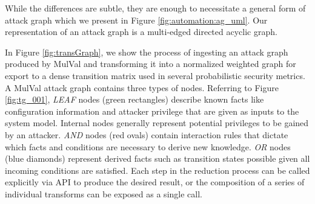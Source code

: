 While the differences are subtle, they are enough to necessitate a general form of attack graph which we present in Figure \ref{fig:automation:ag_uml}. Our representation of an attack graph is a multi-edged directed acyclic graph.     



In Figure \ref{fig:transGraph}, we show the process of ingesting an attack graph produced by MulVal\cite{Ou_Appel_2005} and transforming it into a normalized weighted graph for export to a dense transition matrix used in several probabilistic security metrics. A MulVal attack graph contains three types of nodes. Referring to Figure \ref{fig:tg_001},  \textit{LEAF} nodes (green rectangles) describe known facts like configuration information and attacker privilege that are given as inputs to the system model. Internal nodes generally represent potential privileges to be gained by an attacker.  \textit{AND} nodes (red ovals) contain interaction rules that dictate which facts and conditions are necessary to derive new knowledge. \textit{OR} nodes (blue diamonds) represent derived facts such as transition states possible given all incoming conditions are satisfied. Each step in the reduction process can be called explicitly via API to produce the desired result, or the composition of a series of individual transforms can be exposed as a single call.  

